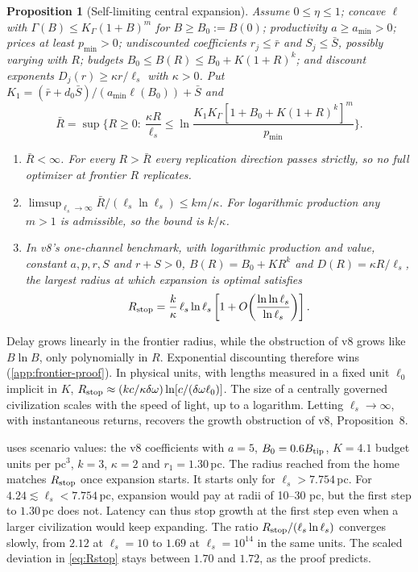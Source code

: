 \documentclass[11pt,a4paper]{article}
\newtheorem{proposition}{Proposition}
\theoremstyle{definition}
\newcommand{\ls}{\ell_s}
\newcommand{\Btip}{B_{\rm tip}}
\begin{document}
\begin{proposition}[Self-limiting central expansion]
\label{prop:frontier}
Assume $0\leq\eta\leq1$; concave $\ell$ with $\Gamma(B)\leq K_\Gamma(1+B)^m$
for $B\geq B_0:=B(0)$; productivity $a\geq a_{\min}>0$; prices at least
$p_{\min}>0$; undiscounted coefficients $r_j\leq\bar r$ and $S_j\leq\bar S$,
possibly varying with $R$; budgets $B_0\leq B(R)\leq B_0+K(1+R)^k$; and discount
exponents $D_j(r)\geq\kappa r/\ls$ with $\kappa>0$. Put
$K_1=(\bar r+d_0\bar S)/(a_{\min}\ell(B_0))+\bar S$ and
\begin{equation}
 \bar R=\sup\Big\{R\geq0:\ \frac{\kappa R}{\ls}\leq
 \ln\frac{K_1K_\Gamma[1+B_0+K(1+R)^k]^m}{p_{\min}}\Big\}.
 \label{eq:Rbar}
\end{equation}
\begin{enumerate}[label=(\roman*),leftmargin=*,nosep]
\item $\bar R<\infty$. For every $R>\bar R$ every replication direction passes
strictly, so no full optimizer at frontier $R$ replicates.
\item $\limsup_{\ls\to\infty}\bar R/(\ls\ln\ls)\leq km/\kappa$. For logarithmic
production any $m>1$ is admissible, so the bound is $k/\kappa$.
\item In v8's one-channel benchmark, with logarithmic production and value,
constant $a,p,r,S$ and $r+S>0$, $B(R)=B_0+KR^k$ and $D(R)=\kappa R/\ls$, the
largest radius at which expansion is optimal satisfies
\begin{equation}
 R_{\rm stop}=\frac k\kappa\,\ls\ln\ls\left[1+O\!\left(\frac{\ln\ln\ls}{\ln\ls}\right)\right].
 \label{eq:Rstop}
\end{equation}
\end{enumerate}
\end{proposition}
\noindent Delay grows linearly in the frontier radius, while the obstruction of
v8 grows like $B\ln B$, only polynomially in $R$. Exponential discounting
therefore wins (\cref{app:frontier-proof}). In physical units, with lengths
measured in a fixed unit $\ell_0$ implicit in $K$,
$R_{\rm stop}\approx(kc/\kappa\delta\omega)\ln[c/(\delta\omega\ell_0)]$. The
size of a centrally governed civilization scales with the speed of light, up to
a logarithm. Letting $\ls\to\infty$, with instantaneous returns, recovers the
growth obstruction of v8, Proposition~8.

 uses scenario values: the v8 coefficients with $a=5$,
$B_0=0.6\Btip$, $K=4.1$ budget units per pc$^3$, $k=3$, $\kappa=2$ and
$r_1=1.30\,$pc. The radius reached from the home matches $R_{\rm stop}$ once
expansion starts. It starts only for $\ls>7.754\,$pc. For
$4.24\lesssim\ls<7.754\,$pc, expansion would pay at radii of 10--30 pc, but the
first step to $1.30\,$pc does not. Latency can thus stop growth at the first
step even when a larger civilization would keep expanding. The ratio
$R_{\rm stop}/(\ls\ln\ls)$ converges slowly, from $2.12$ at $\ls=10$ to $1.69$
at $\ls=10^{14}$ in the same units. The scaled deviation in \cref{eq:Rstop}
stays between $1.70$ and $1.72$, as the proof predicts.
\end{document}
